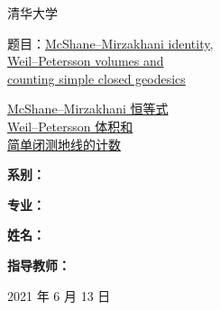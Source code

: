 \begin{center}
    \vspace*{10pt}

    {\huge  \lishu 清华大学}
    
    \vspace{20pt}
    
    \scalebox{1.5}{\huge\sffamily 综合论文训练}
    
    \vspace{40pt}
    
    {\Huge\sffamily
    题目：\underline{McShane--Mirzakhani identity,}\\%
    \underline{Weil--Petersson volumes and}\\%
    \underline{counting simple closed geodesics}

    }{\Huge\sffamily
    \underline{McShane--Mirzakhani 恒等式}\\%
    \underline{Weil--Petersson 体积和}\\%
    \underline{简单闭测地线的计数}

    }
    
  \vspace{40pt}
    
    {\Large \parsep=12pt
        \textbf{系\quad\quad 别：}\quad
        
        \textbf{专\quad\quad 业：}\quad
        
        \textbf{姓\quad\quad 名：}\quad
        
        \textbf{指导教师：}\quad
        
    }
    
    \vspace{40pt}
        
    2021 年 6 月 13 日
\end{center}